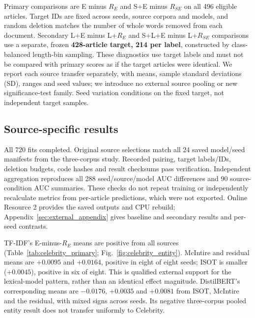 Primary comparisons are E minus $R_E$ and S+E minus $R_{SE}$ on all 496 eligible articles. Target IDs are fixed across seeds, source corpora and models, and random deletion matches the number of whole words removed from each document. Secondary L+E minus L+$R_E$ and S+L+E minus L+$R_{SE}$ comparisons use a separate, frozen \textbf{428-article target, 214 per label}, constructed by class-balanced length-bin sampling. These diagnostics use target labels and must not be compared with primary scores as if the target articles were identical. We report each source transfer separately, with means, sample standard deviations (SD), ranges and seed values; we introduce no external source pooling or new significance-test family. Seed variation conditions on the fixed target, not independent target samples.

\subsection{Source-specific results}
All 720 fits completed. Original source selections match all 24 saved model/seed manifests from the three-corpus study. Recorded pairing, target labels/IDs, deletion budgets, code hashes and result checksums pass verification. Independent aggregation reproduces all 288 seed/source/model AUC differences and 90 source-condition AUC summaries. These checks do not repeat training or independently recalculate metrics from per-article predictions, which were not exported. Online Resource 2 provides the saved outputs and CPU rebuild; Appendix~\ref{sec:external_appendix} gives baseline and secondary results and per-seed contrasts.

\begin{table}[t]
\caption{Celebrity primary comparisons on the fixed 496-article target: mean cross-dataset AUC difference (sample SD) across eight training seeds. Positive favors masking over matched random deletion. SD describes seed variation, not article-sampling uncertainty. Residual: constructed WELFake residual.}\label{tab:celebrity_primary}
\centering\footnotesize
{}
\end{table}

TF-IDF's E-minus-$R_E$ means are positive from all sources (Table~\ref{tab:celebrity_primary}; Fig.~\ref{fig:celebrity_entity}). McIntire and residual means are $+0.0095$ and $+0.0164$, positive in eight of eight seeds; ISOT is smaller ($+0.0045$), positive in six of eight. This is qualified external support for the lexical-model pattern, rather than an identical effect magnitude. DistilBERT's corresponding means are $-0.0176$, $+0.0035$ and $+0.0081$ from ISOT, McIntire and the residual, with mixed signs across seeds. Its negative three-corpus pooled entity result does not transfer uniformly to Celebrity.

